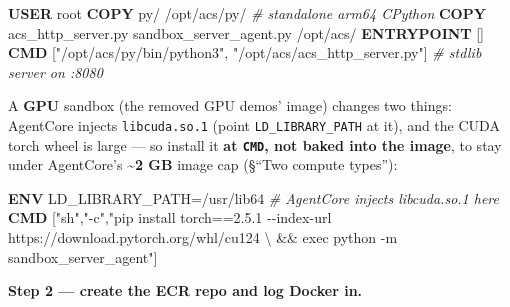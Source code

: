 \documentclass[
  paper=a4,
  ,captions=tableheading
]{scrartcl}
\newenvironment{Shaded}{}{}
\newcommand{\AttributeTok}[1]{\textcolor[rgb]{0.49,0.56,0.16}{#1}}
\newcommand{\BuiltInTok}[1]{\textcolor[rgb]{0.00,0.50,0.00}{#1}}
\newcommand{\CommentTok}[1]{\textcolor[rgb]{0.38,0.63,0.69}{\textit{#1}}}
\newcommand{\ExtensionTok}[1]{#1}
\newcommand{\KeywordTok}[1]{\textcolor[rgb]{0.00,0.44,0.13}{\textbf{#1}}}
\newcommand{\NormalTok}[1]{#1}
\newcommand{\OperatorTok}[1]{\textcolor[rgb]{0.40,0.40,0.40}{#1}}
\newcommand{\StringTok}[1]{\textcolor[rgb]{0.25,0.44,0.63}{#1}}
\newcommand{\VariableTok}[1]{\textcolor[rgb]{0.10,0.09,0.49}{#1}}
\begin{document}
\begin{Shaded}
\begin{Highlighting}[]
\KeywordTok{USER}\NormalTok{ root}
\KeywordTok{COPY}\NormalTok{ py/ /opt/acs/py/                       }\CommentTok{\# standalone arm64 CPython}
\KeywordTok{COPY}\NormalTok{ acs\_http\_server.py sandbox\_server\_agent.py /opt/acs/}
\KeywordTok{ENTRYPOINT}\NormalTok{ []}
\KeywordTok{CMD}\NormalTok{ [}\StringTok{"/opt/acs/py/bin/python3"}\NormalTok{, }\StringTok{"/opt/acs/acs\_http\_server.py"}\NormalTok{]   }\CommentTok{\# stdlib server on :8080}
\end{Highlighting}
\end{Shaded}

A \textbf{GPU} sandbox (the removed GPU demos' image) changes two
things: AgentCore injects \texttt{libcuda.so.1} (point
\texttt{LD\_LIBRARY\_PATH} at it), and the CUDA torch wheel is large ---
so install it \textbf{at \texttt{CMD}, not baked into the image}, to
stay under AgentCore's \textbf{\textasciitilde2 GB} image cap (§``Two
compute types''):

\begin{Shaded}
\begin{Highlighting}[]
\KeywordTok{ENV}\NormalTok{ LD\_LIBRARY\_PATH=/usr/lib64          }\CommentTok{\# AgentCore injects libcuda.so.1 here}
\KeywordTok{CMD}\NormalTok{ [}\StringTok{"sh"}\NormalTok{,}\StringTok{"{-}c"}\NormalTok{,}\StringTok{"pip install torch==2.5.1 {-}{-}index{-}url https://download.pytorch.org/whl/cu124 }\OperatorTok{\textbackslash{}}
\StringTok{                \&\& exec python {-}m sandbox\_server\_agent"}\NormalTok{]}
\end{Highlighting}
\end{Shaded}

\textbf{Step 2 --- create the ECR repo and log Docker in.}

\begin{Shaded}
\end{Shaded}
\end{document}
